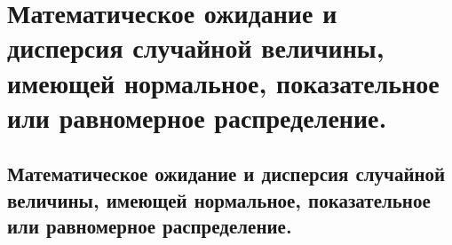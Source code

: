 \section{Математическое ожидание и дисперсия случайной величины, имеющей нормальное, показательное или равномерное распределение.}

\subsection{Математическое ожидание и дисперсия случайной величины, имеющей нормальное, показательное или равномерное распределение.}